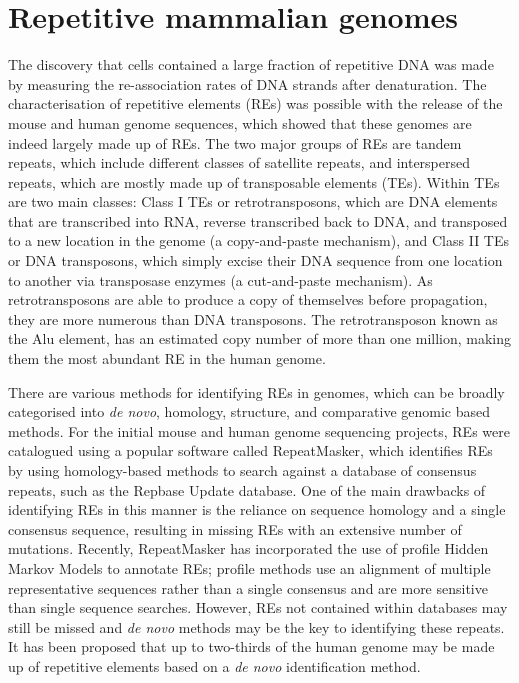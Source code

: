 \section{Repetitive mammalian genomes}

The discovery that cells contained a large fraction of repetitive DNA was made by measuring the re-association rates of DNA strands after denaturation\cite{Britten1968}. The characterisation of repetitive elements (REs) was possible with the release of the mouse\cite{pmid12466850} and human\cite{venter2001sequence, lander2001initial} genome sequences, which showed that these genomes are indeed largely made up of REs. The two major groups of REs are tandem repeats, which include different classes of satellite repeats, and interspersed repeats, which are mostly made up of transposable elements (TEs)\cite{pmid9666329}. Within TEs are two main classes: Class I TEs or retrotransposons, which are DNA elements that are transcribed into RNA, reverse transcribed back to DNA, and transposed to a new location in the genome (a copy-and-paste mechanism), and Class II TEs or DNA transposons, which simply excise their DNA sequence from one location to another via transposase enzymes (a cut-and-paste mechanism). As retrotransposons are able to produce a copy of themselves before propagation, they are more numerous than DNA transposons. The retrotransposon known as the Alu element, has an estimated copy number of more than one million, making them the most abundant RE in the human genome\cite{lander2001initial}.

There are various methods for identifying REs in genomes, which can be broadly categorised into \textit{de novo}, homology, structure, and comparative genomic based methods\cite{Bergman01112007}. For the initial mouse and human genome sequencing projects, REs were catalogued using a popular software called RepeatMasker, which identifies REs by using homology-based methods to search against a database of consensus repeats\cite{pmid19274634}, such as the Repbase Update database\cite{pmid16093699}. One of the main drawbacks of identifying REs in this manner is the reliance on sequence homology and a single consensus sequence, resulting in missing REs with an extensive number of mutations. Recently, RepeatMasker has incorporated the use of profile Hidden Markov Models to annotate REs\cite{pmid23203985}; profile methods use an alignment of multiple representative sequences rather than a single consensus and are more sensitive than single sequence searches. However, REs not contained within databases may still be missed and \textit{de novo} methods may be the key to identifying these repeats. It has been proposed that up to two-thirds of the human genome may be made up of repetitive elements based on a \textit{de novo} identification method\cite{pmid22144907}.

